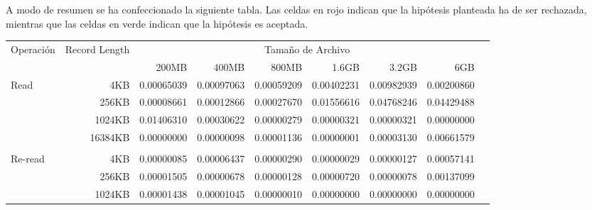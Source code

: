 A modo de resumen se ha confeccionado la siguiente tabla. Las celdas en rojo indican que la hipótesis planteada ha de ser rechazada, mientras que las celdas en verde indican que la hipótesis es aceptada.

\begin{table}[!htp]\centering

\scriptsize
\begin{tabular}{lrrrrrrrr}\toprule
Operación &Record Length &\multicolumn{6}{c}{Tamaño de Archivo} \\\cmidrule{1-8}
& &200MB &400MB &800MB &1.6GB &3.2GB &6GB \\\midrule
\multirow{4}{*}{Read} &4KB &\cellcolor[HTML]{f4c7c3}0.00065039 &\cellcolor[HTML]{f4c7c3}0.00097063 &\cellcolor[HTML]{f4c7c3}0.00059209 &\cellcolor[HTML]{f4c7c3}0.00402231 &\cellcolor[HTML]{f4c7c3}0.00982939 &\cellcolor[HTML]{f4c7c3}0.00200860 \\
&256KB &\cellcolor[HTML]{f4c7c3}0.00008661 &\cellcolor[HTML]{f4c7c3}0.00012866 &\cellcolor[HTML]{f4c7c3}0.00027670 &\cellcolor[HTML]{f4c7c3}0.01556616 &\cellcolor[HTML]{f4c7c3}0.04768246 &\cellcolor[HTML]{f4c7c3}0.04429488 \\
&1024KB &\cellcolor[HTML]{f4c7c3}0.01406310 &\cellcolor[HTML]{f4c7c3}0.00030622 &\cellcolor[HTML]{f4c7c3}0.00000279 &\cellcolor[HTML]{f4c7c3}0.00000321 &\cellcolor[HTML]{f4c7c3}0.00000321 &\cellcolor[HTML]{f4c7c3}0.00000000 \\
&16384KB &\cellcolor[HTML]{f4c7c3}0.00000000 &\cellcolor[HTML]{f4c7c3}0.00000098 &\cellcolor[HTML]{f4c7c3}0.00001136 &\cellcolor[HTML]{f4c7c3}0.00000001 &\cellcolor[HTML]{f4c7c3}0.00003130 &\cellcolor[HTML]{f4c7c3}0.00661579 \\
& & & & & & & \\
\multirow{4}{*}{Re-read} &4KB &\cellcolor[HTML]{f4c7c3}0.00000085 &\cellcolor[HTML]{f4c7c3}0.00006437 &\cellcolor[HTML]{f4c7c3}0.00000290 &\cellcolor[HTML]{f4c7c3}0.00000029 &\cellcolor[HTML]{f4c7c3}0.00000127 &\cellcolor[HTML]{f4c7c3}0.00057141 \\
&256KB &\cellcolor[HTML]{f4c7c3}0.00001505 &\cellcolor[HTML]{f4c7c3}0.00000678 &\cellcolor[HTML]{f4c7c3}0.00000128 &\cellcolor[HTML]{f4c7c3}0.00000720 &\cellcolor[HTML]{f4c7c3}0.00000078 &\cellcolor[HTML]{f4c7c3}0.00137099 \\
&1024KB &\cellcolor[HTML]{f4c7c3}0.00001438 &\cellcolor[HTML]{f4c7c3}0.00001045 &\cellcolor[HTML]{f4c7c3}0.00000010 &\cellcolor[HTML]{f4c7c3}0.00000000 &\cellcolor[HTML]{f4c7c3}0.00000000 &\cellcolor[HTML]{f4c7c3}0.00000000 \\

\end{tabular}
\end{table}
